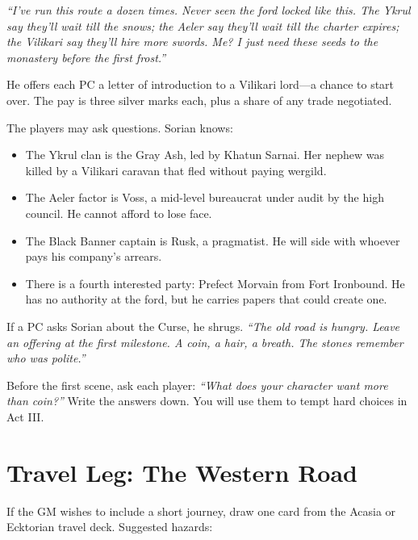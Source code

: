 \documentclass[10pt,twoside]{book}
\begin{document}
\begin{adventurebox}
\textit{``I've run this route a dozen times. Never seen the ford locked like this. The Ykrul say they'll wait till the snows; the Aeler say they'll wait till the charter expires; the Vilikari say they'll hire more swords. Me? I just need these seeds to the monastery before the first frost.''}

He offers each PC a letter of introduction to a Vilikari lord---a chance to start over. The pay is three silver marks each, plus a share of any trade negotiated.
\end{adventurebox}

The players may ask questions. Sorian knows:

\begin{itemize}
\item The Ykrul clan is the Gray Ash, led by Khatun Sarnai. Her nephew was killed by a Vilikari caravan that fled without paying wergild.
\item The Aeler factor is Voss, a mid-level bureaucrat under audit by the high council. He cannot afford to lose face.
\item The Black Banner captain is Rusk, a pragmatist. He will side with whoever pays his company's arrears.
\item There is a fourth interested party: Prefect Morvain from Fort Ironbound. He has no authority at the ford, but he carries papers that could create one.
\end{itemize}

If a PC asks Sorian about the Curse, he shrugs. \textit{``The old road is hungry. Leave an offering at the first milestone. A coin, a hair, a breath. The stones remember who was polite.''}

\begin{tipsbox}
Before the first scene, ask each player: \textit{``What does your character want more than coin?''} Write the answers down. You will use them to tempt hard choices in Act III.
\end{tipsbox}

\section{Travel Leg: The Western Road}

If the GM wishes to include a short journey, draw one card from the Acasia or Ecktorian travel deck. Suggested hazards:
\end{document}
